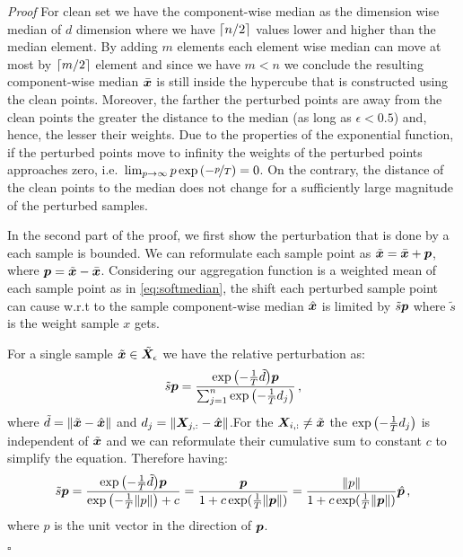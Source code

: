 \documentclass{article} %
\newcommand{\features}{\mX}
\newcommand{\pertm}{\tilde{\mX}_\epsilon}
\newenvironment{proof}{}{$\square$}
\begin{document}
\begin{proof}\textit{Proof}\label{proof:actual_soft_median}
For clean set we have the component-wise median as the dimension wise median of $d$ dimension where we have $\lceil n/2 \rceil$ values lower and higher than the median element. By adding $m$ elements each element wise median can move at most by $\lceil m/2 \rceil$ element and since we have $m<n$ we conclude the resulting component-wise median $\bar{{\bm{x}}}$ is still inside the hypercube that is constructed using the clean points. Moreover, the farther the perturbed points are away from the clean points the greater the distance to the median (as long as \(\epsilon < 0.5\)) and, hence, the lesser their weights. Due to the properties of the exponential function, if the perturbed points move to infinity the weights of the perturbed points approaches zero, i.e.~\(\lim_{p\to\infty} p \exp{(-\nicefrac{p}{T})} = 0\). On the contrary, the distance of the clean points to the median does not change for a sufficiently large magnitude of the perturbed samples.

\iffalse
    In the second part of the proof, we first show the perturbation that is done by a each sample is bounded. We can reformulate each sample point as $\tilde{{\bm{x}}} = \bar{{\bm{x}}} + {\bm{p}}$, where ${\bm{p}} =\tilde{{\bm{x}}} - \bar{{\bm{x}}}$. Considering our aggregation function is a weighted mean of each sample point as in \autoref{eq:softmedian}, the shift each perturbed sample point can cause w.r.t to the sample component-wise median $\hat{{\bm{x}}}$ is limited by $ \tilde{s}{\bm{p}}$ where $\tilde{s}$ is the weight sample $x$ gets.
    
    For a single sample $\tilde{\vx} \in \pertm$ we have the relative perturbation as:
    \begin{equation}
        \tilde{s}{\bm{p}} = \frac{\exp{\left(-\frac{1}{T} \tilde{d} \right )}{\bm{p}}}{\sum_{j=1 }^n \exp{\left (-\frac{1}{T} {d}_j \right )}}\,,
    \end{equation}
    where $\tilde{d}=\|\tilde{{\bm{x}}} - \hat{{\bm{x}}}\|$ and $\evd_j=\|\features_{j,:} - \hat{\vx}\|$.For the $\features_{i,:} \neq \tilde{\vx}$ the $\exp{\left (-\frac{1}{T} {d}_j \right )}$ is independent of $\tilde{{\bm{x}}}$ and we can reformulate their cumulative sum to constant $c$ to simplify the equation. Therefore having:
    \begin{equation}\label{eq:relativeshift}
        \tilde{s}{\bm{p}} = \frac{\exp{\left(-\frac{1}{T} \tilde{d} \right )}{\bm{p}}}{\exp{\left(-\frac{1}{T} \|p\| \right )} + c} = \frac{{\bm{p}}}{1 + c\exp(\frac{1}{T}\|{\bm{p}}\|)} = \frac{\|p\|}{1 + c\exp(\frac{1}{T}\|{\bm{p}}\|)} \hat{{\bm{p}}}\,,
    \end{equation}
    where $\hat{p}$ is the unit vector in the direction of ${\bm{p}}$.
    

\end{proof}
\end{document}
